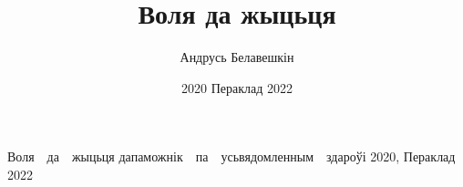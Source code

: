 \documentclass[ebook,10pt,openany]{memoir}
\author{Андрусь Белавешкін}
\title{Воля да жыцьця}
\date{2020 Пераклад 2022}
\begin{document}

\cleartooddpage
\begin{titlingpage}
      {Воля\ \ да\ \ жыцьця}
      {дапаможнік\ \ па\ \ усьвядомленным\ \ здароўі}
      {2020, Пераклад 2022}

\end{titlingpage}

\pagestyle{headings}
\setcounter{page}{3}
\setcounter{tocdepth}{1}
\tableofcontents*
\clearpage

















\end{document}

